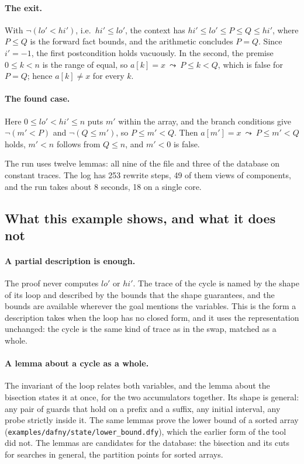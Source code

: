 \documentclass[11pt,a4paper]{article}
\newcommand{\lemma}[1]{\textsf{#1}}
\newcommand{\rw}{\ \leadsto\ }
\begin{document}
\paragraph{The exit.} With $\neg(lo' < hi')$, i.e.\ $hi' \le lo'$, the context has
$hi' \le lo' \le P \le Q \le hi'$, where $P \le Q$ is the forward fact \lemma{bounds}, and the arithmetic
concludes $P = Q$. Since $i' = -1$, the first postcondition holds vacuously. In the second, the premise
$0 \le k < n$ is the range of \lemma{equal}, so $a[k] = x \rw P \le k < Q$, which is false for $P = Q$; hence
$a[k] \ne x$ for every $k$.

\paragraph{The found case.} Here $0 \le lo' < hi' \le n$ puts $m'$ within the array, and the branch conditions
give $\neg(m' < P)$ and $\neg(Q \le m')$, so $P \le m' < Q$. Then $a[m'] = x \rw P \le m' < Q$ holds, $m' < n$
follows from $Q \le n$, and $m' < 0$ is false.

The run uses twelve lemmas: all nine of the file and three of the database on constant traces. The log has 253
rewrite steps, 49 of them views of components, and the run takes about 8 seconds, 18 on a single core.

\subsection{What this example shows, and what it does not}
\label{sec:missing}

\paragraph{A partial description is enough.} The proof never computes $lo'$ or $hi'$. The trace of the cycle is
named by the shape of its loop and described by the bounds that the shape guarantees, and the bounds are available
wherever the goal mentions the variables. This is the form a description takes when the loop has no closed form,
and it uses the representation unchanged: the cycle is the same kind of trace as in the swap, matched as a whole.

\paragraph{A lemma about a cycle as a whole.} The invariant of the loop relates both variables, and the lemma about
the bisection states it at once, for the two accumulators together. Its shape is general: any pair of guards that
hold on a prefix and a suffix, any initial interval, any probe strictly inside it. The same lemmas prove the lower
bound of a sorted array (\texttt{examples/dafny/state/lower\_bound.dfy}), which the earlier form of the tool did not.
The lemmas are candidates for the database: the bisection and its cuts for searches in general, the partition
points for sorted arrays.
\end{document}
